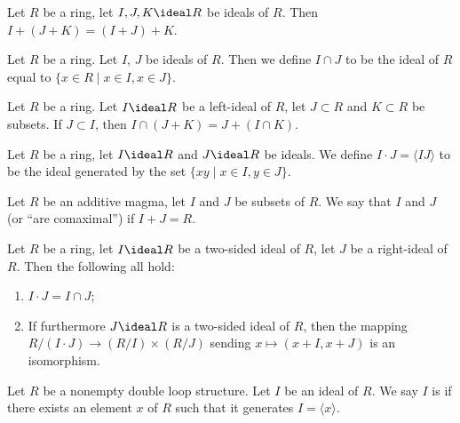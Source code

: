 \begin{theorem}
Let $R$ be a ring, let $I,J,K\ideal R$ be ideals of $R$.
Then $I+(J+K)=(I+J)+K$.
\end{theorem}

\begin{definition}
Let $R$ be a ring. Let $I$, $J$ be ideals of $R$. Then we define
$I\cap J$ to be the ideal of $R$ equal to $\{x\in R\mid x\in I,x\in J\}$.
\end{definition}

\begin{proposition}
Let $R$ be a ring. Let $I\ideal R$ be a left-ideal of $R$, let
$J\subset R$ and $K\subset R$ be subsets.
If $J\subset I$, then $I\cap(J+K)=J+(I\cap K)$.
\end{proposition}

\begin{definition}
Let $R$ be a ring, let $I\ideal R$ and $J\ideal R$ be ideals. We
define $I\cdot J=\langle IJ\rangle$ to be the ideal generated by the
set $\{xy\mid x\in I,y\in J\}$.
\end{definition}

\begin{definition}
Let $R$ be an additive magma, let $I$ and $J$ be subsets of $R$. We
say that $I$ and $J$  (or ``are comaximal'') if $I+J=R$.
\end{definition}

\begin{theorem}
Let $R$ be a ring, let $I\ideal R$ be a two-sided ideal of $R$, let
$J$ be a right-ideal of $R$. Then the following all hold:
\begin{enumerate}
\item{} $I\cdot J=I\cap J$;
\item If furthermore $J\ideal R$ is a two-sided ideal of $R$,
  then the mapping $R/(I\cdot J)\to (R/I)\times(R/J)$ sending
  $x\mapsto(x+I,x+J)$ is an isomorphism.
\end{enumerate}
\end{theorem}

\begin{definition}
Let $R$ be a nonempty double loop structure.
Let $I$ be an ideal of $R$.
We say $I$ is  if there exists an element $x$ of $R$
such that it generates $I = \langle x\rangle$.
\end{definition}

